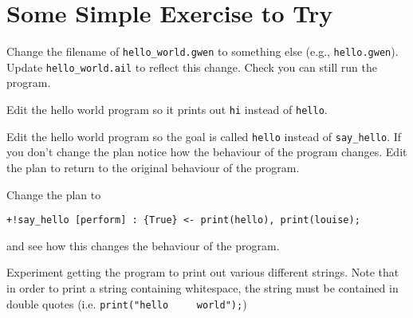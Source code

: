\section{Some Simple Exercise to Try}
\begin{enumerate}
\begin{sloppypar}
\item Change the filename of \texttt{hello\_world.gwen} to something
  else (e.g., \texttt{hello.gwen}).  Update \texttt{hello\_world.ail}
  to reflect this change.  Check you can still run the program.
\item Edit the hello world program so it prints out \texttt{hi} instead of \texttt{hello}.
\item Edit the hello world program so the goal is called
  \texttt{hello} instead of \texttt{say\_hello}.  If you don't change
  the plan notice how the behaviour of the program changes.  Edit the
  plan to return to the original behaviour of the program.
\end{sloppypar}
\item Change the plan to
\begin{verbatim}
+!say_hello [perform] : {True} <- print(hello), print(louise);
\end{verbatim} and see how this changes the behaviour of the program.
\item Experiment getting the program to print out various different
  strings.  Note that in order to print a string containing whitespace,
  the string must be contained in double quotes
  (i.e. \lstinline{print("hello
    world");})
\end{enumerate}

